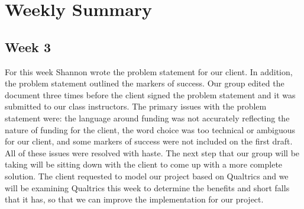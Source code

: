 \documentclass[letterpaper,10pt,serif, draftclsnofoot,onecolumn, compsoc, titlepage]{IEEEtran}
\begin{document}
\section{Weekly Summary}
\subsection{Week 3}

For this week Shannon wrote the problem statement for our client. In addition, the problem statement outlined the markers of success. Our group edited the document three times before the client signed the problem statement and it was submitted to our class instructors. The primary issues with the problem statement were: the language around funding was not accurately reflecting the nature of funding for the client, the word choice was too technical or ambiguous for our client, and some markers of success were not included on the first draft. All of these issues were resolved with haste. The next step that our group will be taking will be sitting down with the client to come up with a more complete solution. The client requested to model our project based on Qualtrics and we will be examining Qualtrics this week to determine the benefits and short falls that it has, so that we can improve the implementation for our project. 
\end{document}
